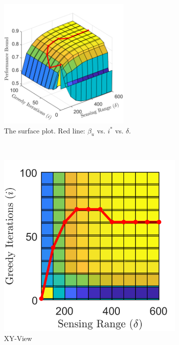 \documentclass[conference]{IEEEtran}
\begin{document}
\begin{figure}[!h]
    \centering
    \begin{subfigure}[t]{\columnwidth}
        \centering
        \includegraphics[width=2.5in]{Figures/Gen1_Exd.png}
        \caption{The surface plot. Red line: $\beta_u$ vs. $i^*$ vs. $\delta$.}
    \end{subfigure}%
    \\
    \centering
    \begin{subfigure}[t]{0.17\textwidth}
        \centering
        \includegraphics[width=\textwidth]{Figures/Gen1_Exd2.png}
        \caption{XY-View}
    \end{subfigure}
    \hspace{3mm}
    \begin{subfigure}[t]{0.17\textwidth}

\end{subfigure}
\end{figure}
\end{document}
